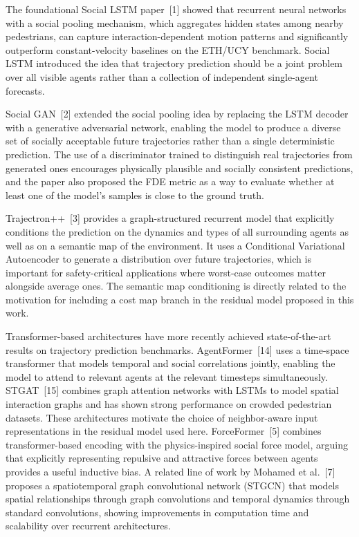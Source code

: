 \documentclass[12pt, a4paper]{article}
\begin{document}
The foundational Social LSTM paper~[1] showed that recurrent neural networks with a social pooling mechanism, which aggregates hidden states among nearby pedestrians, can capture interaction-dependent motion patterns and significantly outperform constant-velocity baselines on the ETH/UCY benchmark. Social LSTM introduced the idea that trajectory prediction should be a joint problem over all visible agents rather than a collection of independent single-agent forecasts.

Social GAN~[2] extended the social pooling idea by replacing the LSTM decoder with a generative adversarial network, enabling the model to produce a diverse set of socially acceptable future trajectories rather than a single deterministic prediction. The use of a discriminator trained to distinguish real trajectories from generated ones encourages physically plausible and socially consistent predictions, and the paper also proposed the FDE metric as a way to evaluate whether at least one of the model's samples is close to the ground truth.

Trajectron++~[3] provides a graph-structured recurrent model that explicitly conditions the prediction on the dynamics and types of all surrounding agents as well as on a semantic map of the environment. It uses a Conditional Variational Autoencoder to generate a distribution over future trajectories, which is important for safety-critical applications where worst-case outcomes matter alongside average ones. The semantic map conditioning is directly related to the motivation for including a cost map branch in the residual model proposed in this work.

Transformer-based architectures have more recently achieved state-of-the-art results on trajectory prediction benchmarks. AgentFormer~[14] uses a time-space transformer that models temporal and social correlations jointly, enabling the model to attend to relevant agents at the relevant timesteps simultaneously. STGAT~[15] combines graph attention networks with LSTMs to model spatial interaction graphs and has shown strong performance on crowded pedestrian datasets. These architectures motivate the choice of neighbor-aware input representations in the residual model used here. ForceFormer~[5] combines transformer-based encoding with the physics-inspired social force model, arguing that explicitly representing repulsive and attractive forces between agents provides a useful inductive bias. A related line of work by Mohamed et al.~[7] proposes a spatiotemporal graph convolutional network (STGCN) that models spatial relationships through graph convolutions and temporal dynamics through standard convolutions, showing improvements in computation time and scalability over recurrent architectures.
\end{document}

